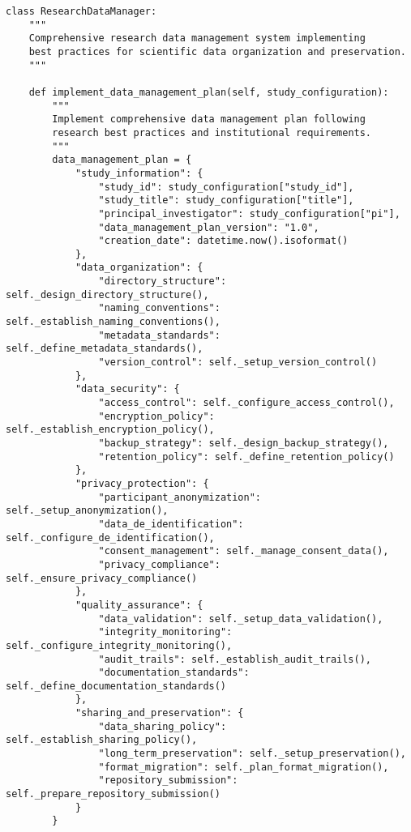 \documentclass[11pt,a4paper]{article}
\begin{document}
\begin{verbatim}
class ResearchDataManager:
    """
    Comprehensive research data management system implementing
    best practices for scientific data organization and preservation.
    """

    def implement_data_management_plan(self, study_configuration):
        """
        Implement comprehensive data management plan following
        research best practices and institutional requirements.
        """
        data_management_plan = {
            "study_information": {
                "study_id": study_configuration["study_id"],
                "study_title": study_configuration["title"],
                "principal_investigator": study_configuration["pi"],
                "data_management_plan_version": "1.0",
                "creation_date": datetime.now().isoformat()
            },
            "data_organization": {
                "directory_structure": self._design_directory_structure(),
                "naming_conventions": self._establish_naming_conventions(),
                "metadata_standards": self._define_metadata_standards(),
                "version_control": self._setup_version_control()
            },
            "data_security": {
                "access_control": self._configure_access_control(),
                "encryption_policy": self._establish_encryption_policy(),
                "backup_strategy": self._design_backup_strategy(),
                "retention_policy": self._define_retention_policy()
            },
            "privacy_protection": {
                "participant_anonymization": self._setup_anonymization(),
                "data_de_identification": self._configure_de_identification(),
                "consent_management": self._manage_consent_data(),
                "privacy_compliance": self._ensure_privacy_compliance()
            },
            "quality_assurance": {
                "data_validation": self._setup_data_validation(),
                "integrity_monitoring": self._configure_integrity_monitoring(),
                "audit_trails": self._establish_audit_trails(),
                "documentation_standards": self._define_documentation_standards()
            },
            "sharing_and_preservation": {
                "data_sharing_policy": self._establish_sharing_policy(),
                "long_term_preservation": self._setup_preservation(),
                "format_migration": self._plan_format_migration(),
                "repository_submission": self._prepare_repository_submission()
            }
        }


\end{verbatim}
\end{document}
